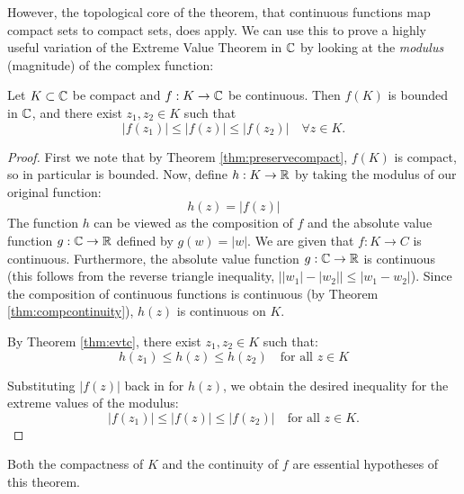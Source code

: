 \documentclass[../analysis1.tex]{subfiles}
\begin{document}
However, the topological core of the theorem, that continuous functions map compact sets to compact sets, does apply. We can use this to prove a highly useful variation of the Extreme Value Theorem in $\mathbb{C}$ by looking at the \textit{modulus} (magnitude) of the complex function:
\begin{theorem}
\label{thm:evtc2}
    \begin{shaded*}
        Let $K \subset \mathbb{C}$ be compact and $f : K\to \mathbb{C}$ be continuous. Then $f(K)$ is bounded in $\mathbb{C}$, and there exist $z_1, z_2 \in K$ such that 
\[ |f(z_1)| \le |f(z)| \le |f(z_2)| \quad \forall z \in K. \]
    \end{shaded*}
\end{theorem}
\begin{proof}
    First we note that by Theorem \ref{thm:preservecompact}, $f(K)$ is compact, so in particular is bounded. Now, define $h : K \to \mathbb{R}$ by taking the modulus of our original function:
    \[ h(z) = |f(z)| \]
    The function $h$ can be viewed as the composition of $f$ and the absolute value function $g:\mathbb{C}\to\mathbb{R}$ defined by $g(w) = |w|$. We are given that $f : K \to C$ is continuous. Furthermore, the absolute value function $g : \mathbb{C} \to \mathbb{R}$ is continuous (this follows from the reverse triangle inequality, $\big| |w_1| - |w_2| \big| \le |w_1 - w_2|$). Since the composition of continuous functions is continuous (by Theorem \ref{thm:compcontinuity}), $h(z)$ is continuous on $K$.

    By Theorem \ref{thm:evtc}, there exist $z_1, z_2 \in K$ such that:
\[ h(z_1) \le h(z) \le h(z_2) \quad \text{for all } z \in K \]

Substituting $|f(z)|$ back in for $h(z)$, we obtain the desired inequality for the extreme values of the modulus:
\[ |f(z_1)| \le |f(z)| \le |f(z_2)| \quad \text{for all } z \in K. \]\qedhere
\end{proof}
\begin{remark}
    Both the compactness of $K$ and the continuity of $f$ are essential hypotheses of this theorem.
\end{remark}
\begin{center}
\end{center}
\end{document}
